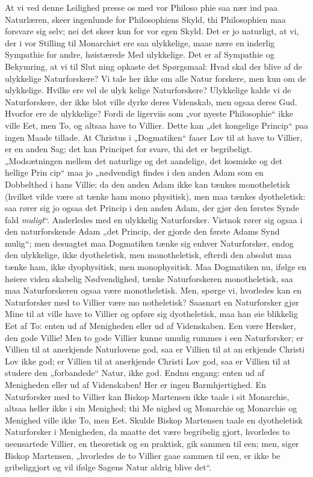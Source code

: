 \documentclass[12pt]{book}
\newcommand{\opage}[1]{\marginnote{\footnotesize\textit{[#1]}}}
\begin{document}
At vi ved denne Leilighed presse os med vor Philoso\-%
phie saa nær ind paa Naturlæren, skeer ingenlunde for
Philosophiens Skyld, thi Philosophien maa forsvare sig selv;
nei det skeer kun for vor egen Skyld. Det er jo naturligt,
at vi, der i vor Stilling til Monarchiet ere saa ulykkelige,
maae nære en inderlig Sympathie for andre, høistærede Med\-%
ulykkelige. Det er af Sympathie og Bekymring, at vi til Slut\-%
ning opkaste det Spørgsmaal: Hvad skal der blive af de
ulykkelige Naturforskere? Vi tale her ikke om alle Natur\-%
forskere, men kun om de ulykkelige. Hvilke ere vel de ulyk\-%
kelige Naturforskere? Ulykkelige kalde vi de Naturforskere,
der ikke blot ville dyrke deres Videnskab, men ogsaa deres
Gud. Hvorfor ere de ulykkelige? Fordi de ligerviis som
„vor nyeste Philosophie“ ikke ville Eet, men To, og altsaa
have to Villier. Dette kan „det kongelige Princip“ paa ingen
Maade tillade. At Christus i „Dogmatiken“ faaer Lov til
at have to Villier, er en anden Sag; det kan Principet for\-%
svare, thi det er begribeligt. „Modsætningen mellem det
naturlige og det aandelige, det kosmiske og det hellige Prin\-%
cip“ maa jo „nødvendigt findes i den anden Adam som en
Dobbelthed i hans Villie; da den anden Adam ikke kan
\opage{39}\setcounter{footnote}{0}%
tænkes monotheletisk (hvilket vilde være at tænke ham mono\-%
physitisk), men maa tænkes dyotheletisk: saa rører sig jo ogsaa
det Princip i den anden Adam, der gjør den førstes Synde\-%
fald \emph{muligt}“. Anderledes med en ulykkelig Naturforsker.
Vistnok rører sig ogsaa i den naturforskende Adam „det
Princip, der gjorde den første Adams Synd mulig“; men
desuagtet maa Dogmatiken tænke sig enhver Naturforsker,
endog den ulykkelige, ikke dyotheletisk, men monotheletisk,
efterdi den absolut maa tænke ham, ikke dyophysitisk, men
monophysitisk. Maa Dogmatiken nu, ifølge en høiere viden\-%
skabelig Nødvendighed, tænke Naturforskeren monotheletisk, saa
maa Naturforskeren ogsaa være monotheletisk. Men, spørge
vi, hvorledes kan en Naturforsker med to Villier være mo\-%
notheletisk? Saasnart en Naturforsker gjør Mine til at
ville have to Villier og opføre sig dyotheletisk, maa han øie\-%
blikkelig Eet af To: enten ud af Menigheden eller ud af
Videnskaben. Een være Hersker, den gode Villie! Men to gode
Villier kunne umulig rummes i een Naturforsker; er Villien
til at anerkjende Naturlovene god, saa er Villien til at an\-%
erkjende Christi Lov ikke god; er Villien til at anerkjende
Christi Lov god, saa er Villien til at studere den „forbandede“
Natur, ikke god. Endnu engang: enten ud af Menigheden
eller ud af Videnskaben! Her er ingen Barmhjertighed. En
Naturforsker med to Villier kan Biskop Martensen ikke taale
i sit Monarchie, altsaa heller ikke i sin Menighed; thi Me\-%
nighed og Monarchie og Monarchie og Menighed ville ikke
To, men Eet. Skulde Biskop Martensen taale en dyotheletisk
Naturforsker i Menigheden, da maatte det være begribelig\-%
gjort, hvorledes to ueensartede Villier, en theoretisk og en
praktisk, gik sammen til een; men, siger Biskop Martensen,
„hvorledes de to Villier gaae sammen til een, er ikke be\-%
gribeliggjort og vil ifølge Sagens Natur aldrig blive det“.
\end{document}
